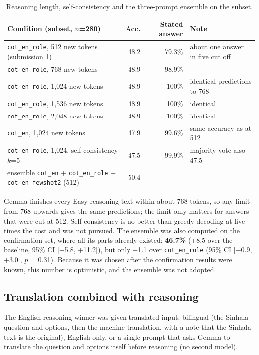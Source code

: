 \documentclass[10pt,a4paper]{article}
\newcommand{\cond}[1]{\texttt{#1}}
\begin{document}
\begin{table}[h]
\centering\footnotesize\setlength{\tabcolsep}{4pt}
\begin{tabular}{lrrl}
\toprule
Condition (subset, $n$=280) & Acc. & Stated answer & Note\\
\midrule
\cond{cot\_en\_role}, 512 new tokens (submission 1) & 48.2 & 79.3\% & about one answer in five cut off\\
\cond{cot\_en\_role}, 768 new tokens & 48.9 & 98.9\% & \\
\cond{cot\_en\_role}, 1,024 new tokens & 48.9 & 100\% & identical predictions to 768\\
\cond{cot\_en\_role}, 1,536 new tokens & 48.9 & 100\% & identical\\
\cond{cot\_en\_role}, 2,048 new tokens & 48.9 & 100\% & identical\\
\cond{cot\_en}, 1,024 new tokens & 47.9 & 99.6\% & same accuracy as at 512\\
\cond{cot\_en\_role}, 1,024, self-consistency $k$=5 & 47.5 & 99.9\% & majority vote also 47.5\\
ensemble \cond{cot\_en} + \cond{cot\_en\_role} + \cond{cot\_en\_fewshot2} (512) & 50.4 & -- & \\
\bottomrule
\end{tabular}
\caption{Reasoning length, self-consistency and the three-prompt ensemble on the subset.}
\label{tab:length}
\end{table}

Gemma finishes every Easy reasoning text within about 768 tokens, so any limit from 768 upwards gives the same
predictions; the limit only matters for answers that were cut at 512. Self-consistency is no better than greedy
decoding at five times the cost and was not pursued. The ensemble was also computed on the confirmation set, where
all its parts already existed: \textbf{46.7\%} (+8.5 over the baseline, 95\% CI [+5.8, +11.2]), but only +1.1 over
\cond{cot\_en\_role} (95\% CI [$-$0.9, +3.0], $p$ = 0.31). Because it was chosen after the confirmation results were
known, this number is optimistic, and the ensemble was not adopted.

\subsection{Translation combined with reasoning}
The English-reasoning winner was given translated input: bilingual (the Sinhala question and options, then the
machine translation, with a note that the Sinhala text is the original), English only, or a single prompt that asks
Gemma to translate the question and options itself before reasoning (no second model).
\end{document}
